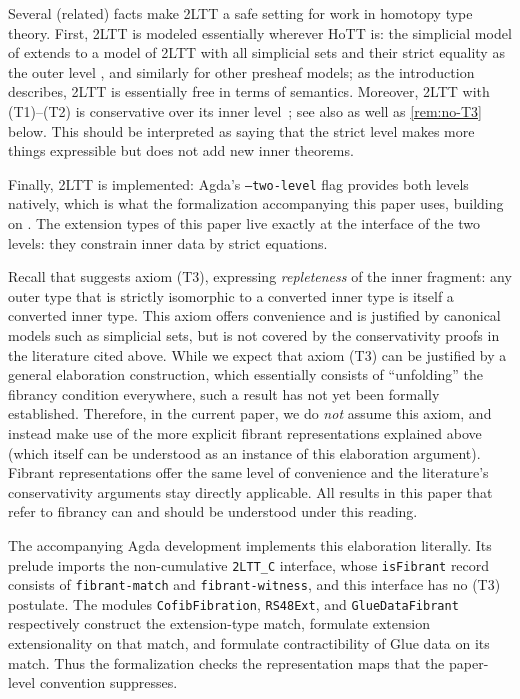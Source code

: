 Several (related) facts make 2LTT a safe setting for work in homotopy type theory. First, 2LTT is modeled essentially wherever HoTT is: the
simplicial model of \citet{KapulkinLumsdaine2021} extends to a model of 2LTT
with all simplicial sets and their strict equality as the outer level
\citep[\S2.5]{2LTT}, and similarly for other presheaf models;
as the introduction describes, 2LTT is essentially free in terms of semantics.
Moreover, 2LTT with (T1)--(T2) is conservative over its inner
level~\citep[Prop.~2.19]{2LTT}; see also
\citet{andras-staging,BocquetThesis} as well as \cref{rem:no-T3} below. This should be interpreted as saying that
the strict level makes more things expressible but does not add new inner
theorems.

Finally, 2LTT is implemented: Agda's \texttt{--two-level}
flag \citep{agdareadthedocs} provides both levels natively, which is what
the formalization accompanying this paper uses, building
on \citet{2LTTAgda,Uskuplu2025}. The extension types of this paper live
exactly at the interface of the two levels: they constrain inner data by
strict equations.



\begin{remark}\label{rem:no-T3}
	Recall that \cite{2LTT} suggests axiom (T3), expressing \emph{repleteness} of the inner fragment:
	any outer type that is strictly isomorphic to a converted inner type is itself a converted inner type.
	This axiom offers convenience and is justified by canonical models such as simplicial sets, but is not covered by the conservativity proofs in the literature cited above.
	While we expect that axiom (T3) can be justified by a general elaboration construction, which essentially consists of \enquote{unfolding} the fibrancy condition everywhere,
	such a result has not yet been formally established.
	Therefore, in the current paper, we do \emph{not} assume this axiom, and instead make use of the more explicit fibrant representations explained above (which itself can be understood as an instance of this elaboration argument).
	Fibrant representations offer the same level of convenience and the literature's conservativity arguments stay directly applicable. 
	All results in this paper that refer to fibrancy can and should be understood under this reading.
	
	The accompanying Agda development implements this elaboration literally. Its
	prelude imports the non-cumulative \texttt{2LTT\_C} interface, whose
	\texttt{isFibrant} record consists of \texttt{fibrant-match} and
	\texttt{fibrant-witness}, and this interface has no (T3) postulate. The modules
	\texttt{CofibFibration}, \texttt{RS48Ext}, and \texttt{GlueDataFibrant}
	respectively construct the extension-type match, formulate extension
	extensionality on that match, and formulate contractibility of Glue data on
	its match. Thus the formalization checks the representation maps that the
	paper-level convention suppresses.
\end{remark}



